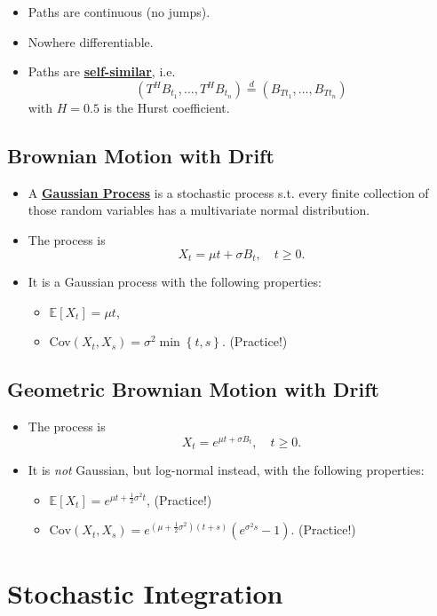 \documentclass[twocolumn,landscape,10pt]{article}
\theoremstyle{definition}
\begin{document}
\begin{itemize}
    \item Paths are continuous (no jumps).
    \item Nowhere differentiable.
    \item Paths are \textbf{\underline{self-similar}}, i.e.\
        \[
            (T^HB_{t_1},\ldots,T^HB_{t_n})\stackrel{d}{=}(B_{Tt_1},\ldots,B_{Tt_n})
        \]
        with $H=0.5$ is the Hurst coefficient.
\end{itemize}

\subsection{Brownian Motion with Drift}

\begin{itemize}
    \item A \textbf{\underline{Gaussian Process}} is a stochastic process s.t.
        every finite collection of those random variables has a multivariate
        normal distribution.
    \item The process is
        \[
            X_t=\mu t+\sigma B_t,\quad t\ge 0.
        \]
    \item It is a Gaussian process with the following properties:
        \begin{itemize}
            \item $\mathbb{E}[X_t]=\mu t$,
            \item Cov$(X_t, X_s)=\sigma^2\min\left\{t,s\right\}$. (Practice!)
        \end{itemize}
\end{itemize}

\subsection{Geometric Brownian Motion with Drift}

\begin{itemize}
    \item The process is
        \[
            X_t=e^{\mu t+\sigma B_t},\quad t\ge 0.
        \]
    \item It is \emph{not} Gaussian, but log-normal instead, with the following
        properties:
        \begin{itemize}
            \item $\mathbb{E}[X_t]=e^{\mu t+\frac{1}{2}\sigma^2t}$, (Practice!)
            \item
                $\text{Cov}(X_t,X_s)=e^{\left(\mu+\frac{1}{2}\sigma^2\right)(t+s)}\left(e^{\sigma^2s}-1\right)$.
                (Practice!)
        \end{itemize}
\end{itemize}


\section{Stochastic Integration}
\end{document}
